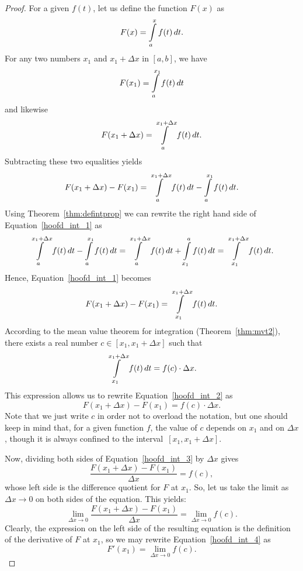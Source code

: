 \begin{proof}
For a given $f(t)$, let us define the function $F(x)$ as
$$
\displaystyle F(x)=\displaystyle \int\limits_{a}^{x}f(t)\,dt.
$$
For any two numbers $x_1$ and $x_1 + \Delta x$ in $[a, b]$, we have
$$
\displaystyle F(x_{1})=\displaystyle \int\limits _{a}^{x_{1}}f(t)\,dt
$$
and likewise
$$
\displaystyle F(x_{1}+\Delta x)=\displaystyle \int\limits _{a}^{x_{1}+\Delta x}f(t)\,dt.
$$
Subtracting these two equalities yields
\begin{equation}
\displaystyle F(x_{1}+\Delta x)-F(x_{1})=\displaystyle \int\limits_{a}^{x_{1}+\Delta x}f(t)\,dt-\displaystyle \int\limits _{a}^{x_{1}}f(t)\,dt.
\label{hoofd_int_1}
\end{equation}
Using Theorem~\ref{thm:defintprop} we can rewrite the right hand side of Equation~\eqref{hoofd_int_1} as
$$
\displaystyle \int\limits _{a}^{x_{1}+\Delta x}f(t)\,dt-\displaystyle \int\limits _{a}^{x_{1}}f(t)\,dt=\int\limits _{a}^{x_{1}+\Delta x}f(t)\,dt+\displaystyle \int\limits _{x_1}^{a}f(t)\,dt=\displaystyle \int\limits _{x_{1}}^{x_{1}+\Delta x}f(t)\,dt.
$$
Hence, Equation~\eqref{hoofd_int_1} becomes
\begin{equation}
\displaystyle F(x_{1}+\Delta x)-F(x_{1})=\displaystyle \int\limits _{x_{1}}^{x_{1}+\Delta x}f(t)\,dt.
\label{hoofd_int_2}
\end{equation}
According to the mean value theorem for integration (Theorem~\ref{thm:mvt2}), there exists a real number $\displaystyle c\in [x_{1},x_{1}+\Delta x]$ such that
$$
\displaystyle \int\limits _{x_{1}}^{x_{1}+\Delta x}f(t)\,dt=f(c)\cdot \Delta x.
$$
This expression allows us to rewrite Equation~\eqref{hoofd_int_2} as 
\begin{equation}
\displaystyle F(x_{1}+\Delta x)-F(x_{1})=f(c)\cdot \Delta x.
\label{hoofd_int_3}
\end{equation}
Note that we just write $c$ in order not to overload the notation, but one should keep in mind that, for a given function $f$,  the value of $c$ depends on $x_1$  and on $\Delta x$, though it is always confined to the interval $\,[x_{1},x_{1}+\Delta x]$.

Now, dividing both sides of Equation~\eqref{hoofd_int_3} by $\Delta x$ gives
$$
\displaystyle {\frac {F(x_{1}+\Delta x)-F(x_{1})}{\Delta x}}=f(c),
$$
whose left side is the difference quotient for $F$ at $x_1$. So, let us take the limit as $\displaystyle \Delta x\to0$  on both sides of the equation. This yields: 
\begin{equation}
\displaystyle \lim _{\Delta x\to 0}{\frac {F(x_{1}+\Delta x)-F(x_{1})}{\Delta x}}=\lim _{\Delta x\to 0}f(c).
\label{hoofd_int_4}
\end{equation}
Clearly, the expression on the left side of the resulting equation is the definition of the derivative of $F$ at $x_1$, so we may rewrite Equation~\eqref{hoofd_int_4} as
\begin{equation}
\displaystyle F'(x_{1})=\lim _{\Delta x\to 0}f(c).
\label{hoofd_int_5}
\end{equation}


\end{proof}
